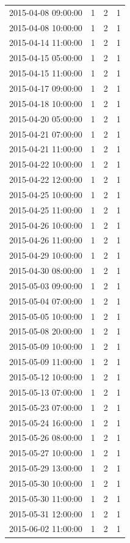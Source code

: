 \begin{tabular}{lrrr}
2015-04-08 09:00:00 & 1 & 2 & 1 \\
2015-04-08 10:00:00 & 1 & 2 & 1 \\
2015-04-14 11:00:00 & 1 & 2 & 1 \\
2015-04-15 05:00:00 & 1 & 2 & 1 \\
2015-04-15 11:00:00 & 1 & 2 & 1 \\
2015-04-17 09:00:00 & 1 & 2 & 1 \\
2015-04-18 10:00:00 & 1 & 2 & 1 \\
2015-04-20 05:00:00 & 1 & 2 & 1 \\
2015-04-21 07:00:00 & 1 & 2 & 1 \\
2015-04-21 11:00:00 & 1 & 2 & 1 \\
2015-04-22 10:00:00 & 1 & 2 & 1 \\
2015-04-22 12:00:00 & 1 & 2 & 1 \\
2015-04-25 10:00:00 & 1 & 2 & 1 \\
2015-04-25 11:00:00 & 1 & 2 & 1 \\
2015-04-26 10:00:00 & 1 & 2 & 1 \\
2015-04-26 11:00:00 & 1 & 2 & 1 \\
2015-04-29 10:00:00 & 1 & 2 & 1 \\
2015-04-30 08:00:00 & 1 & 2 & 1 \\
2015-05-03 09:00:00 & 1 & 2 & 1 \\
2015-05-04 07:00:00 & 1 & 2 & 1 \\
2015-05-05 10:00:00 & 1 & 2 & 1 \\
2015-05-08 20:00:00 & 1 & 2 & 1 \\
2015-05-09 10:00:00 & 1 & 2 & 1 \\
2015-05-09 11:00:00 & 1 & 2 & 1 \\
2015-05-12 10:00:00 & 1 & 2 & 1 \\
2015-05-13 07:00:00 & 1 & 2 & 1 \\
2015-05-23 07:00:00 & 1 & 2 & 1 \\
2015-05-24 16:00:00 & 1 & 2 & 1 \\
2015-05-26 08:00:00 & 1 & 2 & 1 \\
2015-05-27 10:00:00 & 1 & 2 & 1 \\
2015-05-29 13:00:00 & 1 & 2 & 1 \\
2015-05-30 10:00:00 & 1 & 2 & 1 \\
2015-05-30 11:00:00 & 1 & 2 & 1 \\
2015-05-31 12:00:00 & 1 & 2 & 1 \\
2015-06-02 11:00:00 & 1 & 2 & 1 \\

\end{tabular}
